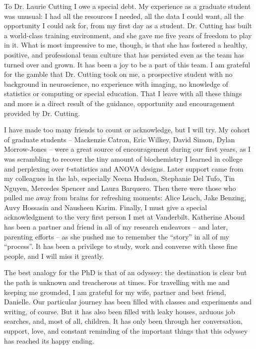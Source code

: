 \documentclass[12pt]{report}  %
\begin{document}
To Dr. Laurie Cutting I owe a special debt. My experience as a graduate student was unusual: I had all the resources I needed, all the data I could want, all the opportunity I could ask for, from my first day as a student. Dr. Cutting has built a world-class training environment, and she gave me five years of freedom to play in it. What is most impressive to me, though, is that she has fostered a healthy, positive, and professional team culture that has persisted even as the team has turned over and grown. It has been a joy to be a part of this team. I am grateful for the gamble that Dr. Cutting took on me, a prospective student with no background in neuroscience, no experience with imaging, no knowledge of statistics or computing or special education. That I leave with all these things and more is a direct result of the guidance, opportunity and encouragement provided by Dr. Cutting.

I have made too many friends to count or acknowledge, but I will try. My cohort of graduate students -- Mackenzie Catron, Eric Wilkey, David Simon, Dylan Morrow-Jones -- were a great source of encouragement during our first years, as I was scrambling to recover the tiny amount of biochemistry I learned in college and perplexing over $t$-statistics and ANOVA designs. Later support came from my colleagues in the lab, especially Neena Hudson, Stephanie Del Tufo, Tin Nguyen, Mercedes Spencer and Laura Barquero. Then there were those who pulled me away from brains for refreshing moments: Alice Leach, Jake Benzing, Auvy Hossasin and Nausheen Karim. Finally, I must give a special acknowledgment to the very first person I met at Vanderbilt. Katherine Aboud has been a partner and friend in all of my research endeavors -- and later, parenting efforts -- as she pushed me to remember the ``story'' in all of my ``process''. It has been a privilege to study, work and converse with these fine people, and I will miss it greatly. 

The best analogy for the PhD is that of an odyssey: the destination is clear but the path is unknown and treacherous at times. For travelling with me and keeping me grounded, I am grateful for my wife, partner and best friend, Danielle. Our particular journey has been filled with classes and experiments and writing, of course. But it has also been filled with leaky houses, arduous job searches, and, most of all, children. It has only been through her conversation, support, love, and constant reminding of the important things that this odyssey has reached its happy ending.
\end{document}
